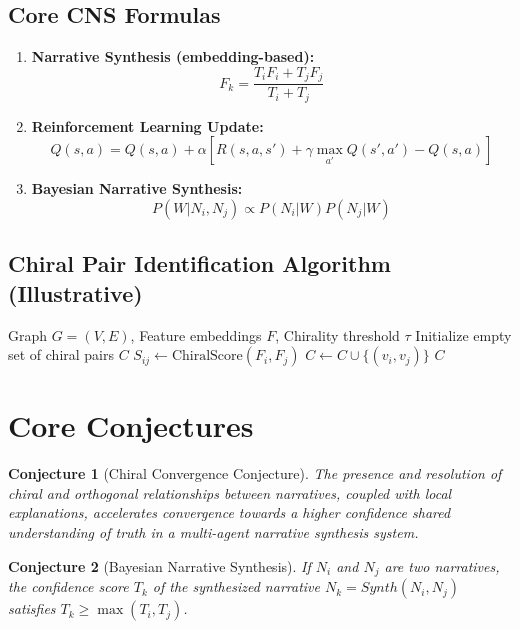 \documentclass{article}
\newtheorem{conjecture}{Conjecture}
\begin{document}
\subsection{Core CNS Formulas}

\begin{enumerate}
    \item \textbf{Narrative Synthesis (embedding-based): }
    \[ F_k = \frac{T_i F_i + T_j F_j}{T_i + T_j} \]
    \item \textbf{Reinforcement Learning Update:}
    \[ Q(s, a) = Q(s, a) + \alpha [R(s, a, s') + \gamma \max_{a'} Q(s', a') - Q(s, a)] \]
    \item \textbf{Bayesian Narrative Synthesis:}
    \[ P(W|N_i, N_j) \propto P(N_i|W)P(N_j|W) \]
\end{enumerate}

\subsection{Chiral Pair Identification Algorithm (Illustrative)}

\begin{algorithm}[H]
\caption{Chiral Pair Identification}
\begin{algorithmic}[1]
\Require Graph $G=(V,E)$, Feature embeddings $F$, Chirality threshold $\tau$
\State Initialize empty set of chiral pairs $C$
    \State $S_{ij} \gets \text{ChiralScore}(F_i, F_j)$ 
        \State $C \gets C \cup \{(v_i, v_j)\}$
    \EndIf
\EndFor
\Return $C$
\end{algorithmic}
\end{algorithm}


\section{Core Conjectures}

\begin{conjecture}[Chiral Convergence Conjecture]
The presence and resolution of chiral and orthogonal relationships between narratives, coupled with local explanations, accelerates convergence towards a higher confidence shared understanding of truth in a multi-agent narrative synthesis system.
\end{conjecture}

\begin{conjecture}[Bayesian Narrative Synthesis]
If $N_i$ and $N_j$ are two narratives, the confidence score $T_k$ of the synthesized narrative $N_k = Synth(N_i, N_j)$ satisfies $T_k \ge \max(T_i, T_j)$.
\end{conjecture}
\end{document}
